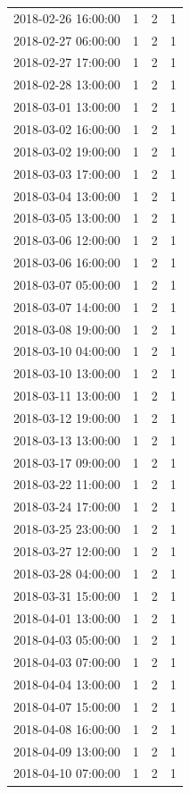 \begin{tabular}{lrrr}
2018-02-26 16:00:00 & 1 & 2 & 1 \\
2018-02-27 06:00:00 & 1 & 2 & 1 \\
2018-02-27 17:00:00 & 1 & 2 & 1 \\
2018-02-28 13:00:00 & 1 & 2 & 1 \\
2018-03-01 13:00:00 & 1 & 2 & 1 \\
2018-03-02 16:00:00 & 1 & 2 & 1 \\
2018-03-02 19:00:00 & 1 & 2 & 1 \\
2018-03-03 17:00:00 & 1 & 2 & 1 \\
2018-03-04 13:00:00 & 1 & 2 & 1 \\
2018-03-05 13:00:00 & 1 & 2 & 1 \\
2018-03-06 12:00:00 & 1 & 2 & 1 \\
2018-03-06 16:00:00 & 1 & 2 & 1 \\
2018-03-07 05:00:00 & 1 & 2 & 1 \\
2018-03-07 14:00:00 & 1 & 2 & 1 \\
2018-03-08 19:00:00 & 1 & 2 & 1 \\
2018-03-10 04:00:00 & 1 & 2 & 1 \\
2018-03-10 13:00:00 & 1 & 2 & 1 \\
2018-03-11 13:00:00 & 1 & 2 & 1 \\
2018-03-12 19:00:00 & 1 & 2 & 1 \\
2018-03-13 13:00:00 & 1 & 2 & 1 \\
2018-03-17 09:00:00 & 1 & 2 & 1 \\
2018-03-22 11:00:00 & 1 & 2 & 1 \\
2018-03-24 17:00:00 & 1 & 2 & 1 \\
2018-03-25 23:00:00 & 1 & 2 & 1 \\
2018-03-27 12:00:00 & 1 & 2 & 1 \\
2018-03-28 04:00:00 & 1 & 2 & 1 \\
2018-03-31 15:00:00 & 1 & 2 & 1 \\
2018-04-01 13:00:00 & 1 & 2 & 1 \\
2018-04-03 05:00:00 & 1 & 2 & 1 \\
2018-04-03 07:00:00 & 1 & 2 & 1 \\
2018-04-04 13:00:00 & 1 & 2 & 1 \\
2018-04-07 15:00:00 & 1 & 2 & 1 \\
2018-04-08 16:00:00 & 1 & 2 & 1 \\
2018-04-09 13:00:00 & 1 & 2 & 1 \\
2018-04-10 07:00:00 & 1 & 2 & 1 \\

\end{tabular}
